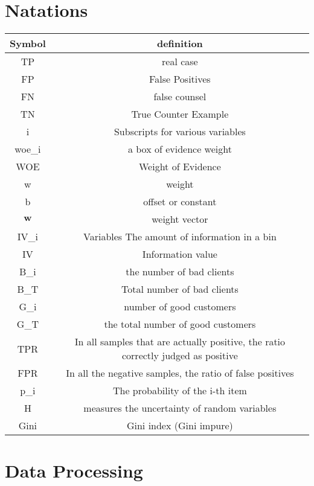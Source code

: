 \documentclass{mcmthesis}
\begin{document}
\section{Natations}
\begin{tabular}{cc}
\toprule
Symbol & definition\\
\hline
TP & real case \\
\hline
FP & False Positives\\
\hline
FN & false counsel\\
\hline
TN & True Counter Example\\
\hline
i & Subscripts for various variables \\
\hline
woe\_i & a box of evidence weight \\
\hline
WOE & Weight of Evidence \\
\hline
w & weight \\
\hline
b & offset or constant \\
\hline
$\mathbf{w}$ & weight vector \\
\hline
IV\_i & Variables The amount of information in a bin \\
\hline
IV & Information value \\
\hline
B\_i & the number of bad clients \\
\hline
B\_T & Total number of bad clients \\
\hline
G\_i & number of good customers \\
\hline
G\_T & the total number of good customers \\
\hline
TPR & In all samples that are actually positive, the ratio correctly judged as positive\\
\hline
FPR & In all the negative samples, the ratio of false positives\\
\hline
p\_i & The probability of the i-th item\\
\hline
H & measures the uncertainty of random variables\\
\hline
Gini & Gini index (Gini impure)\\
\hline
\end{tabular}

\section{Data Processing}
\end{document}
